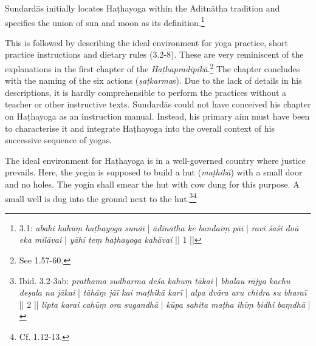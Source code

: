 Sundardās initially locates Haṭhayoga within the Āditnātha tradition and specifies the union of sun and moon as its definition.\footnote{ 3.1: \textit{abahi hahūṃ haṭhayoga sunāī} | \textit{ādinātha ke bandaiṃ pāī} | \textit{ravi śaśi doū eka milāvai} | \textit{yāhī teṃ haṭhayoga kahāvai} || 1 ||}

This is followed by describing the ideal environment for yoga practice, short practice instructions and dietary rules (3.2-8). These are very reminiscent of the explanations in the first chapter of the \textit{Haṭhapradipikā}.\footnote{See  1.57-60.} The chapter concludes with the naming of the six actions (\textit{ṣaṭkarma}s). Due to the lack of details in his descriptions, it is hardly comprehensible to perform the practices without a teacher or other instructive texts. Sundardās could not have conceived his chapter on Haṭhayoga as an instruction manual. Instead, his primary aim must have been to characterise it and integrate Haṭhayoga into the overall context of his successive sequence of yogas.  

The ideal environment for Haṭhayoga is in a well-governed country where justice prevails. Here, the yogin is supposed to build a hut (\textit{maṭhikā}) with a small door and no holes. The yogin shall smear the hut with cow dung for this purpose. A small well is dug into the ground next to the hut.\footnote{Ibid. 3.2-3ab: \textit{prathama sudharma deśa kahuṃ tākai} | \textit{bhalau rājya kachu deṣala na jākai} | \textit{tāhāṃ jāī kai maṭhikā karī} | \textit{alpa dvāra aru chidra su bharaī} || 2 || \textit{lipta karai cahūṃ ora sugandhā} | \textit{kūpa sahita maṭha ihīṃ bidhi baṃdhā} |}\footnote{Cf.  1.12-13.}

